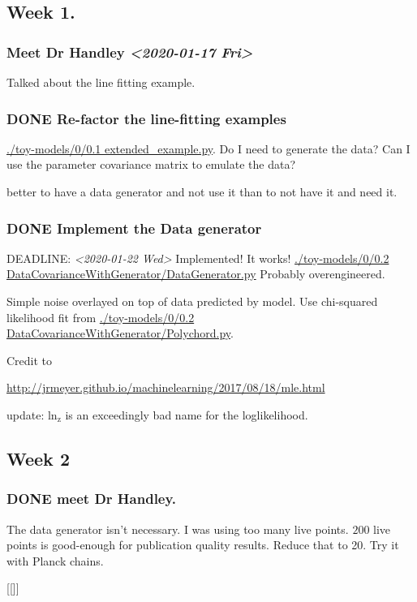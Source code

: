 \documentclass[11pt]{article}
\begin{document}
\subsection{Week 1.}
\label{sec:org8f9eb09}
\subsubsection{Meet Dr Handley \textit{<2020-01-17 Fri>}}
\label{sec:orgccc5f4f}
Talked about the line fitting example. 
\subsubsection{{\bfseries\sffamily DONE} Re-factor the line-fitting examples}
\label{sec:org0224ed8}
\url{./toy-models/0/0.1 extended\_example.py}.  Do I need to generate the
data? Can I use the parameter covariance matrix to emulate the
data? 

better to have a data generator and not use it than to not have it
and need it.
\subsubsection{{\bfseries\sffamily DONE} Implement the Data generator}
\label{sec:orga9b0a97}
DEADLINE: \textit{<2020-01-22 Wed> } 
Implemented! It works!
\url{./toy-models/0/0.2 DataCovarianceWithGenerator/DataGenerator.py}
Probably overengineered. 

Simple noise overlayed on top of data predicted by model. Use
chi-squared likelihood fit from 
\url{./toy-models/0/0.2 DataCovarianceWithGenerator/Polychord.py}. 

Credit to 

\url{http://jrmeyer.github.io/machinelearning/2017/08/18/mle.html}

update: ln\(_{\text{z}}\) is an exceedingly bad name for the loglikelihood. 
\subsection{Week 2}
\label{sec:orgf6c7f92}
\subsubsection{{\bfseries\sffamily DONE} meet Dr Handley.}
\label{sec:orgb6c6640}
The data generator isn't necessary. I was using too many live
points. \(200\) live points is good-enough for publication quality
results. Reduce that to 20. Try it with Planck chains. 

[[]]
\end{document}
